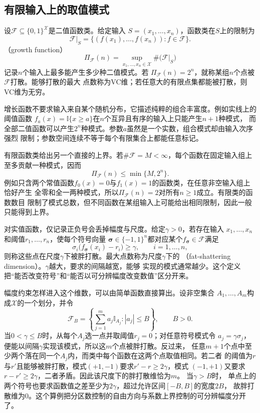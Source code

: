 \subsection{有限输入上的取值模式}

设$\mathcal{F}\subseteq\{0,1\}^{\mathcal{X}}$是二值函数类。给定输入
$S=(x_1,\ldots,x_n)$，函数类在$S$上的限制为
\[
  \mathcal{F}|_S
  =
  \{(f(x_1),\ldots,f(x_n)):f\in\mathcal{F}\}.
\]
（growth function）
\begin{equation}
  \Pi_{\mathcal{F}}(n)
  =
  \sup_{x_1,\ldots,x_n\in\mathcal{X}}
  \#\bigl(\mathcal{F}|_S\bigr)
  \label{eq:functional-growth-function}
\end{equation}
记录$n$个输入上最多能产生多少种二值模式。若
$\Pi_{\mathcal{F}}(n)=2^n$，就称某组$n$个点被$\mathcal{F}$打散。能够打散的最大
点数称为VC维；若任意大的有限点集都能被打散，则VC维为无穷。

增长函数不要求输入来自某个随机分布，它描述纯粹的组合丰富度。例如实线上的阈值函数
$f_a(x)=\mathbb{I}\{x\geq a\}$在$n$个互异且有序的输入上只能产生$n+1$种模式，
而全部二值函数可以产生$2^n$种模式。参数$a$虽然是一个实数，组合模式却由输入次序强烈
限制；参数空间连续不等于每个有限集合上都能任意标记。

有限函数类给出另一个直接的上界。若$\#\mathcal{F}=M<\infty$，每个函数在固定输入组上
至多贡献一种模式，因而
\[
  \Pi_{\mathcal{F}}(n)\leq\min\{M,2^n\}.
\]
例如只含两个常值函数$f_0(x)=0$与$f_1(x)=1$的函数类，在任意非空输入组上恰好产生
全零和全一两种模式，所以$\Pi_{\mathcal{F}}(n)=2$对所有$n\geq1$成立。有限类的函数数目
限制了模式总数，但不同函数在某组输入上可能给出相同限制，因此一般只能得到上界。

对实值函数，仅记录正负号会丢掉幅度与尺度。给定$\gamma>0$，若存在输入
$x_1,\ldots,x_n$和阈值$r_1,\ldots,r_n$，使每个符号向量
$\bm{\sigma}\in\{-1,1\}^n$都对应某个$f_{\bm{\sigma}}\in\mathcal{F}$满足
\begin{equation}
  \sigma_i\bigl(f_{\bm{\sigma}}(x_i)-r_i\bigr)
  \geq\gamma,\qquad i=1,\ldots,n,
  \label{eq:functional-fat-shattering}
\end{equation}
则称这些点在尺度$\gamma$下被胖打散。最大点数称为尺度$\gamma$下的
（fat-shattering dimension）。$\gamma$越大，要求的间隔越宽，能够
实现的模式通常越少。这个定义把“能否改变符号”和“能否以可分辨幅度改变数值”区分开来。

幅度约束怎样进入这个维数，可以由简单函数直接算出。设非空集合
$A_1,\ldots,A_m$构成$\mathcal{X}$的一个划分，并令
\[
  \mathcal{F}_B
  =
  \left\{
    \sum_{j=1}^{m}a_j\mathbb{I}_{A_j}:
    |a_j|\leq B
  \right\},
  \qquad B>0.
\]
当$0<\gamma\leq B$时，从每个$A_j$选一点并取阈值$r_j=0$；对任意符号模式令
$a_j=\gamma\sigma_j$，便能以间隔$\gamma$实现该模式，所以这$m$个点被胖打散。反过来，
任意$m+1$个点中至少两个落在同一个$A_j$内，而类中每个函数在这两个点取值相同。若二者
的阈值为$r$与$r'$且能够被胖打散，模式$(+1,-1)$要求$r'-r\geq2\gamma$，模式
$(-1,+1)$又要求$r-r'\geq2\gamma$，二者矛盾。因此该尺度下的胖打散维恰为$m$。
当$\gamma>B$时，
单点上的两个符号也要求函数值之差至少为$2\gamma$，超过允许区间$[-B,B]$的宽度$2B$，
故胖打散维为$0$。这个算例把分区数控制的自由方向与系数上界控制的可分辨幅度分开了。

